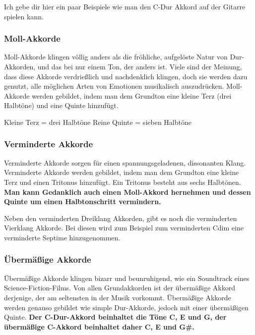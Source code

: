 Ich gebe dir hier ein paar Beispiele wie man den C-Dur Akkord auf der Gitarre spielen kann.


\subsubsection{Moll-Akkorde}
Moll-Akkorde klingen völlig anders als die fröhliche, aufgelöste Natur von Dur-Akkorden, und das bei nur einem Ton, der anders ist. Viele sind der Meinung, dass diese Akkorde verdrießlich und nachdenklich klingen, doch sie werden dazu genutzt, alle möglichen Arten von Emotionen musikalisch auszudrücken. Moll-Akkorde werden gebildet, indem man dem Grundton eine kleine Terz (drei Halbtöne) und eine Quinte hinzufügt.


Kleine Terz = drei Halbtöne
Reine Quinte = sieben Halbtöne

\subsubsection{Verminderte Akkorde}
Verminderte Akkorde sorgen für einen spannungsgeladenen, dissonanten Klang. Verminderte Akkorde werden gebildet, indem man dem Grundton eine kleine Terz und einen Tritonus hinzufügt. Ein Tritonus besteht aus sechs Halbtönen. \textbf{Man kann Gedanklich auch einen Moll-Akkord hernehmen und dessen Quinte um einen Halbtonschritt vermindern.}


Neben den verminderten Dreiklang Akkorden, gibt es noch die verminderten Vierklang Akkorde. Bei diesen wird zum Beispiel zum verminderten Cdim eine verminderte Septime hinzugenommen.



\subsubsection{Übermäßige Akkorde}
Übermäßige Akkorde klingen bizarr und beunruhigend, wie ein Soundtrack eines Science-Fiction-Films. Von allen Grundakkorden ist der übermäßige Akkord derjenige, der am seltensten in der Musik vorkommt. Übermäßige Akkorde werden genauso gebildet wie simple Dur-Akkorde, jedoch mit einer übermäßigen Quinte. \textbf{Der C-Dur-Akkord beinhaltet die Töne C, E und G, der übermäßige C-Akkord beinhaltet daher C, E und G\#.}

